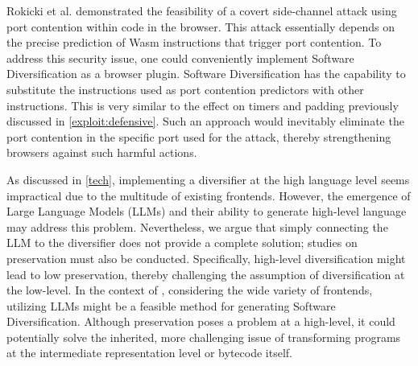 \begin{strategy}
    Rokicki et al. \cite{10.1145/3488932.3517411} demonstrated the feasibility of a covert side-channel attack using port contention within \Wasm code in the browser. 
    This attack essentially depends on the precise prediction of Wasm instructions that trigger port contention.
    To address this security issue, one could conveniently implement Software Diversification as a browser plugin. 
    Software Diversification has the capability to substitute the \wasm instructions used as port contention predictors with other instructions. 
    This is very similar to the effect on timers and padding previously discussed in \autoref{exploit:defensive}.
    Such an approach would inevitably eliminate the port contention in the specific port used for the attack, thereby strengthening browsers against such harmful actions.
\end{strategy}


\begin{comment}
    
    \wrule{Dataset augmentation:} The \Wasm ecosystem is still in its infancy compared to more mature programming environments. 
    The study by Hilbig et al. in 2021 found only 8,000 unique \Wasm binaries globally\cite{Hilbig2021AnES}, a fraction of the 1.5 million and 1.7 million packages available in npm and PyPI, respectively. 
    This limited dataset poses challenges for machine learning-based analysis tools, which require extensive data for effective training. 
    The scarcity of \Wasm programs also exacerbates the problem of software monoculture, increasing the risk of compromised \Wasm programs being consumed\cite{usenixWasm2020}. 
\end{comment}


\begin{strategy}
    As discussed in \autoref{tech}, implementing a diversifier at the high language level seems impractical due to the multitude of existing frontends.
    However, the emergence of Large Language Models (LLMs) and their ability to generate high-level language may address this problem. 
    Nevertheless, we argue that simply connecting the LLM to the diversifier does not provide a complete solution; studies on preservation must also be conducted.
    Specifically, high-level diversification might lead to low preservation, thereby challenging the assumption of diversification at the low-level.
    In the context of \Wasm, considering the wide variety of frontends, utilizing LLMs might be a feasible method for generating Software Diversification.
    Although preservation poses a problem at a high-level, it could potentially solve the inherited, more challenging issue of transforming programs at the intermediate representation level or \Wasm bytecode itself.
 
\end{strategy}
